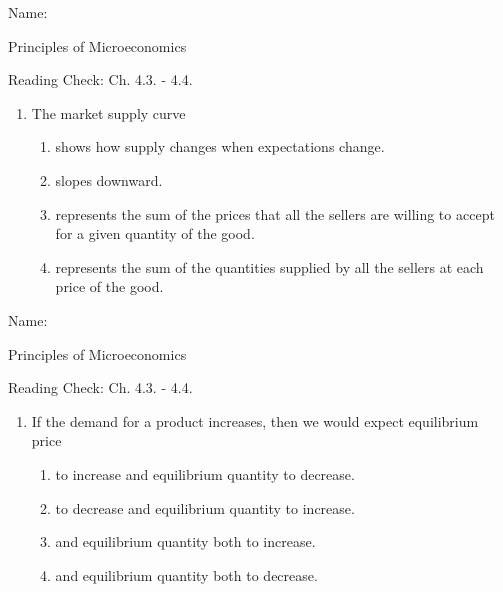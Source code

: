 \documentclass{article}
\begin{document}
\bigskip

Name: \underline{\phantom{xxxxxxxxxxxxxxxxxxxxxxxxxxxxxxxxxxxxxxxx}}

Principles of Microeconomics

Reading Check: Ch. 4.3. - 4.4.

\begin{enumerate}

\item The market supply curve

	\begin{enumerate}
	
	\item shows how supply changes when expectations change.
	
	\item slopes downward.
	
	\item represents the sum of the prices that all the sellers are willing to accept for a given quantity of the good.
	
	\item represents the sum of the quantities supplied by all the sellers at each price of the good. 
	
	\end{enumerate}

\end{enumerate}

\bigskip

Name: \underline{\phantom{xxxxxxxxxxxxxxxxxxxxxxxxxxxxxxxxxxxxxxxx}}

Principles of Microeconomics

Reading Check: Ch. 4.3. - 4.4.

\begin{enumerate}

\item If the demand for a product increases, then we would expect equilibrium price

	\begin{enumerate}
	
	\item to increase and equilibrium quantity to decrease.
	
	\item to decrease and equilibrium quantity to increase.
	
	\item and equilibrium quantity both to increase.
	
	\item and equilibrium quantity both to decrease.
	
	\end{enumerate}

\end{enumerate}
\end{document}
